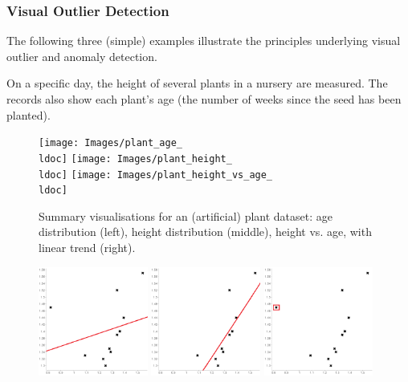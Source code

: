 \subsubsection*{Visual Outlier Detection} The following three (simple) examples illustrate the principles underlying visual outlier and anomaly detection. 
\begin{Example}On a specific day, the height of several plants in a nursery are measured. The records also show each plant's age (the number of weeks since the seed has been planted). 
\begin{figure}[t]
\centering
\texttt{[image: Images/plant\_age\_\\ldoc]}\quad
\texttt{[image: Images/plant\_height\_\\ldoc]}\quad
\texttt{[image: Images/plant\_height\_vs\_age\_\\ldoc]}
\caption[\small Summary visualisations for a plant dataset]{\small Summary visualisations for an (artificial) plant dataset: age distribution (left), height distribution (middle), height vs. age, with linear trend (right).} \label{fig:plant_data}
\end{figure}
\begin{figure}[t]
\centering
\includegraphics[width=0.32\textwidth]{Images/scatter_plot_linear_1}\quad
\includegraphics[width=0.32\textwidth]{Images/scatter_plot_linear_2}\quad
\includegraphics[width=0.32\textwidth]{Images/scatter_plot_2}

\end{figure}
\end{Example}
